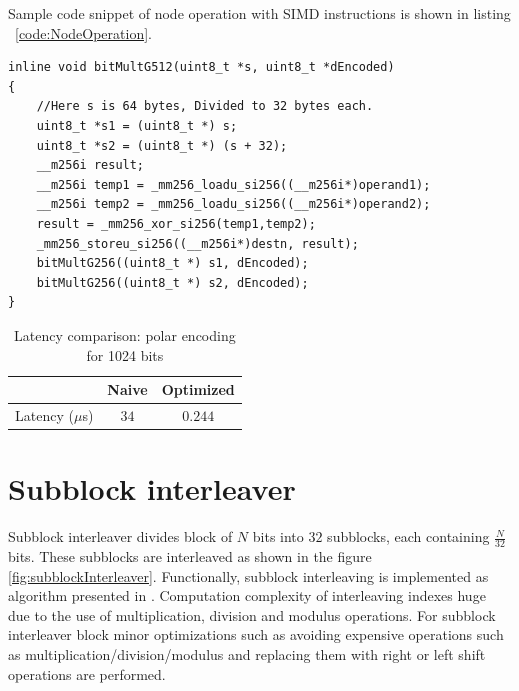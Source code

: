 Sample code snippet of node operation with SIMD instructions is shown in listing ~\ref{code:NodeOperation}.

\begin{code}
	\label{code:NodeOperation}
\begin{verbatim}
inline void bitMultG512(uint8_t *s, uint8_t *dEncoded) 
{
	//Here s is 64 bytes, Divided to 32 bytes each.
	uint8_t *s1 = (uint8_t *) s;
	uint8_t *s2 = (uint8_t *) (s + 32);
	__m256i result;
	__m256i temp1 = _mm256_loadu_si256((__m256i*)operand1);
	__m256i temp2 = _mm256_loadu_si256((__m256i*)operand2);
	result = _mm256_xor_si256(temp1,temp2);
	_mm256_storeu_si256((__m256i*)destn, result);
	bitMultG256((uint8_t *) s1, dEncoded);
	bitMultG256((uint8_t *) s2, dEncoded);
}
\end{verbatim}
\end{code}

\begin{table}[!h]
	\begin{center}
		\caption{Latency comparison: polar encoding for 1024 bits}
		\label{tab:polarEncoder}
		\begin{tabular}{c|c|c} %
			\textbf{ } & Naive & Optimized \\
			\hline
			Latency ($\mu$s) & $34$ & $0.244$\\
		\end{tabular}
	\end{center}
\end{table}


\section{Subblock interleaver}
Subblock interleaver divides block of $N$ bits into $32$ subblocks, each containing $\frac{N}{32}$ bits. These subblocks are interleaved as shown in the figure \ref{fig:subblockInterleaver}. Functionally, subblock interleaving is implemented as algorithm presented in \cite{3gpp.38.212}. Computation complexity of interleaving indexes huge due to the use of multiplication, division and modulus operations. For subblock interleaver block minor optimizations such as avoiding expensive operations such as multiplication/division/modulus and replacing them with right or left shift operations are performed.

